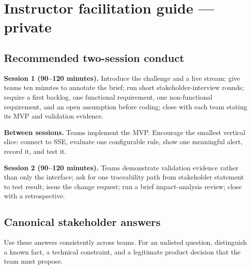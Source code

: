 \documentclass[11pt,a4paper]{article}
\begin{document}
\newpage
\section{Instructor facilitation guide --- private}

\subsection{Recommended two-session conduct}
\textbf{Session 1 (90--120 minutes).} Introduce the challenge and a live stream; give teams ten minutes to annotate the brief; run short stakeholder-interview rounds; require a first backlog, one functional requirement, one non-functional requirement, and an open assumption before coding; close with each team stating its MVP and validation evidence.

\textbf{Between sessions.} Teams implement the MVP. Encourage the smallest vertical slice: connect to SSE, evaluate one configurable rule, show one meaningful alert, record it, and test it.

\textbf{Session 2 (90--120 minutes).} Teams demonstrate validation evidence rather than only the interface; ask for one traceability path from stakeholder statement to test result; issue the change request; run a brief impact-analysis review; close with a retrospective.

\subsection{Canonical stakeholder answers}
Use these answers consistently across teams. For an unlisted question, distinguish a known fact, a technical constraint, and a legitimate product decision that the team must propose.
\end{document}
